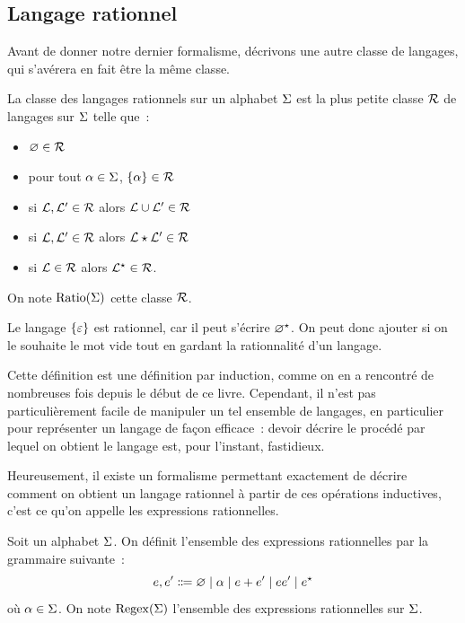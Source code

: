 \subsection{Langage rationnel}

Avant de donner notre dernier formalisme, décrivons une autre classe de
langages, qui s'avérera en fait être la même classe.

\begin{definition}
  La classe des langages rationnels sur un alphabet $\Sigma$ est la plus petite
  classe $\mathcal{R}$ de langages sur $\Sigma$ telle que~:
  \begin{itemize}
  \item $\varnothing \in \mathcal{R}$
  \item pour tout $\alpha \in \Sigma$, $\{\alpha\}\in \mathcal{R}$
  \item si $\mathcal L,\mathcal L' \in \mathcal{R}$ alors $\mathcal L\cup \mathcal L' \in \mathcal{R}$
  \item si $\mathcal L,\mathcal L' \in \mathcal{R}$ alors $\mathcal L\mathbin{\star} \mathcal L' \in \mathcal{R}$
  \item si $\mathcal L \in \mathcal{R}$ alors $\mathcal L^{\star} \in \mathcal{R}$.
  \end{itemize}
  On note $\Ratio(\ABA)$ cette classe $\mathcal{R}$.
  \index[notation]{$\Ratio(\ABA)$}
\end{definition}

\begin{remark}
  Le langage $\{\varepsilon\}$ est rationnel, car il peut s'écrire $\varnothing^{\star}$. On
  peut donc ajouter si on le souhaite le mot vide tout en gardant la
  rationnalité d'un langage.
\end{remark}

Cette définition est une définition par induction, comme on en a rencontré
de nombreuses fois depuis le début de ce livre. Cependant, il n'est pas
particulièrement facile de manipuler un tel ensemble de langages, en particulier
pour représenter un langage de façon efficace~: devoir décrire le procédé par
lequel on obtient le langage est, pour l'instant, fastidieux.

Heureusement, il existe un formalisme permettant exactement de décrire comment
on obtient un langage rationnel à partir de ces opérations inductives, c'est ce
qu'on appelle les expressions rationnelles.

\begin{definition}
  Soit un alphabet $\Sigma$. On définit l'ensemble des expressions rationnelles
  par la grammaire suivante~:
  \[e,e' \inddefeq \vide\mid \varla \mid e + e' \mid e e' \mid \toSt{e}\]
  où $\alpha \in \Sigma$. On note $\operatorname{Regex}(\Sigma)$ l'ensemble des expressions
  rationnelles sur $\Sigma$.
\end{definition}

